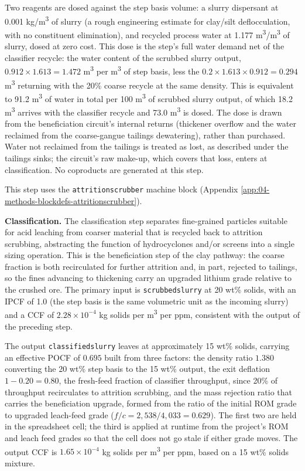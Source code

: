 \documentclass{article}
\renewcommand\_{\textunderscore\allowbreak}
\begin{document}
Two reagents are dosed against the step basis volume: a slurry dispersant at 0.001 \si{kg/m^3} of slurry (a rough engineering estimate for clay/silt deflocculation, with no constituent elimination), and recycled process water at 1.177 \si{m^3/m^3} of slurry, dosed at zero cost. This dose is the step's full water demand net of the classifier recycle: the water content of the scrubbed slurry output, $0.912 \times 1.613=1.472$ \si{m^3} per \si{m^3} of step basis, less the $0.2 \times 1.613 \times 0.912=0.294$ \si{m^3} returning with the 20\% coarse recycle at the same density. This is equivalent to 91.2 \si{m^3} of water in total per 100 \si{m^3} of scrubbed slurry output, of which 18.2 \si{m^3} arrives with the classifier recycle and 73.0 \si{m^3} is dosed. The dose is drawn from the beneficiation circuit's internal returns (thickener overflow and the water reclaimed from the coarse-gangue tailings dewatering), rather than purchased. Water not reclaimed from the tailings is treated as lost, as described under the tailings sinks; the circuit's raw make-up, which covers that loss, enters at classification. No coproducts are generated at this step.

This step uses the \texttt{attrition\_scrubber} machine block (Appendix \ref{app:04-methods-blockdefs-attritionscrubber}).

\medskip
\noindent\textbf{Classification.}\quad
The classification step separates fine-grained particles suitable for acid leaching from coarser material that is recycled back to attrition scrubbing, abstracting the function of hydrocyclones and/or screens into a single sizing operation. This is the beneficiation step of the clay pathway: the coarse fraction is both recirculated for further attrition and, in part, rejected to tailings, so the fines advancing to thickening carry an upgraded lithium grade relative to the crushed ore. The primary input is \texttt{scrubbed\_slurry} at 20 wt\% solids, with an IPCF of 1.0 (the step basis is the same volumetric unit as the incoming slurry) and a CCF of $2.28 \times 10^{-4}$ kg solids per \si{m^3} per ppm, consistent with the output of the preceding step.

The output \texttt{classified\_slurry} leaves at approximately 15 wt\% solids, carrying an effective POCF of $0.695$ built from three factors: the density ratio $1.380$ converting the 20 wt\% step basis to the 15 wt\% output, the exit deflation $1-0.20=0.80$, the fresh-feed fraction of classifier throughput, since 20\% of throughput recirculates to attrition scrubbing, and the mass rejection ratio that carries the beneficiation upgrade, formed from the ratio of the initial ROM grade to upgraded leach-feed grade ($f/c=2,538/4,033=0.629$). The first two are held in the spreadsheet cell; the third is applied at runtime from the project's ROM and leach feed grades so that the cell does not go stale if either grade moves. The output CCF is $1.65 \times 10^{-4}$ kg solids per \si{m^3} per ppm, based on a 15 wt\% solids mixture. 
\end{document}
